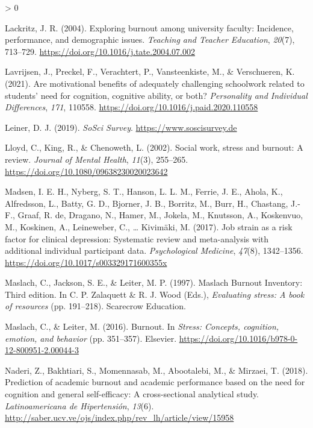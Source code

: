 \documentclass[
  english,
  man]{apa6}
\newlength{\cslhangindent}
\newenvironment{CSLReferences}[2] %
 {%
  \setlength{\parindent}{0pt}
  \ifodd #1 \everypar{\setlength{\hangindent}{\cslhangindent}}\ignorespaces\fi
  \ifnum #2 > 0
  \setlength{\parskip}{#2\baselineskip}
  \fi
 }%
 {}
\begin{document}
\begin{CSLReferences}{1}{0}
\leavevmode\hypertarget{ref-Lackritz2004}{}%
Lackritz, J. R. (2004). Exploring burnout among university faculty: Incidence, performance, and demographic issues. \emph{Teaching and Teacher Education}, \emph{20}(7), 713--729. \url{https://doi.org/10.1016/j.tate.2004.07.002}

\leavevmode\hypertarget{ref-Lavrijsen2021}{}%
Lavrijsen, J., Preckel, F., Verachtert, P., Vansteenkiste, M., \& Verschueren, K. (2021). Are motivational benefits of adequately challenging schoolwork related to students' need for cognition, cognitive ability, or both? \emph{Personality and Individual Differences}, \emph{171}, 110558. \url{https://doi.org/10.1016/j.paid.2020.110558}

\leavevmode\hypertarget{ref-Leiner2019}{}%
Leiner, D. J. (2019). \emph{{SoSci} {Survey}}. \url{https://www.soscisurvey.de}

\leavevmode\hypertarget{ref-Lloyd2002}{}%
Lloyd, C., King, R., \& Chenoweth, L. (2002). Social work, stress and burnout: A review. \emph{Journal of Mental Health}, \emph{11}(3), 255--265. \url{https://doi.org/10.1080/09638230020023642}

\leavevmode\hypertarget{ref-Madsen2017}{}%
Madsen, I. E. H., Nyberg, S. T., Hanson, L. L. M., Ferrie, J. E., Ahola, K., Alfredsson, L., Batty, G. D., Bjorner, J. B., Borritz, M., Burr, H., Chastang, J.-F., Graaf, R. de, Dragano, N., Hamer, M., Jokela, M., Knutsson, A., Koskenvuo, M., Koskinen, A., Leineweber, C., \ldots{} Kivimäki, M. (2017). Job strain as a risk factor for clinical depression: Systematic review and meta-analysis with additional individual participant data. \emph{Psychological Medicine}, \emph{47}(8), 1342--1356. \url{https://doi.org/10.1017/s003329171600355x}

\leavevmode\hypertarget{ref-Maslach1997}{}%
Maslach, C., Jackson, S. E., \& Leiter, M. P. (1997). Maslach {Burnout} {Inventory}: {Third} edition. In C. P. Zalaquett \& R. J. Wood (Eds.), \emph{Evaluating stress: A book of resources} (pp. 191--218). Scarecrow Education.

\leavevmode\hypertarget{ref-Maslach2016}{}%
Maslach, C., \& Leiter, M. (2016). Burnout. In \emph{Stress: Concepts, cognition, emotion, and behavior} (pp. 351--357). Elsevier. \url{https://doi.org/10.1016/b978-0-12-800951-2.00044-3}

\leavevmode\hypertarget{ref-Naderi2018}{}%
Naderi, Z., Bakhtiari, S., Momennasab, M., Abootalebi, M., \& Mirzaei, T. (2018). Prediction of academic burnout and academic performance based on the need for cognition and general self-efficacy: {A} cross-sectional analytical study. \emph{Latinoamericana de Hipertensión}, \emph{13}(6). \url{http://saber.ucv.ve/ojs/index.php/rev_lh/article/view/15958}


\end{CSLReferences}
\end{document}
